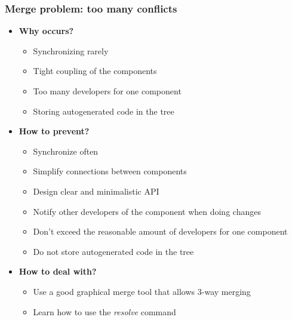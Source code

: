 \documentclass{beamer}
\begin{document}
\begin{frame}
\frametitle{Merge problem: too many conflicts}
\begin{itemize}
\item \textbf{Why occurs?}
\begin{itemize}
\item Synchronizing rarely
\item Tight coupling of the components
\item Too many developers for one component
\item Storing autogenerated code in the tree
\end{itemize}
\item \textbf{How to prevent?}
\begin{itemize}
\item Synchronize often
\item Simplify connections between components
\item Design clear and minimalistic API
\item Notify other developers of the component when doing changes
\item Don't exceed the reasonable amount of developers for one component 
\item Do not store autogenerated code in the tree
\end{itemize}
\item \textbf{How to deal with?}
\begin{itemize}
\item Use a good graphical merge tool that allows 3-way merging
\item Learn how to use the \textit{resolve} command
\end{itemize}
\end{itemize}
\end{frame}
\end{document}
